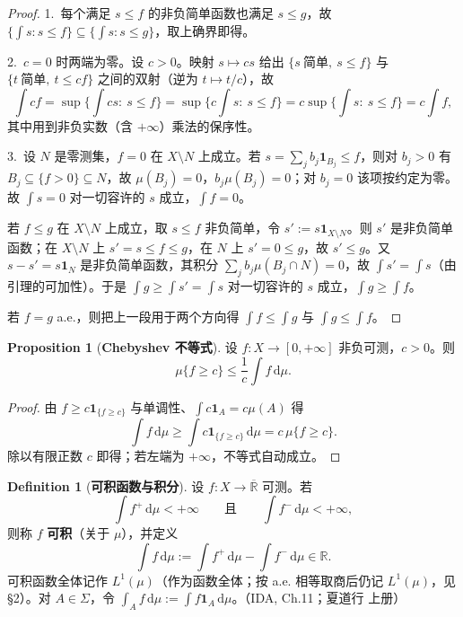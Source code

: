 \documentclass[oneside]{book}
\theoremstyle{definition}
\newcommand{\R}{\mathbb{R}}
\newcommand{\dd}{\mathrm{d}}
\theoremstyle{definition}
\newtheorem{proposition}{Proposition}[section]
\newtheorem{definition}{Definition}[section]
\begin{document}
	\begin{proof}
		1.\ 每个满足 $s\leqslant f$ 的非负简单函数也满足 $s\leqslant g$，故 $\{\int s:s\leqslant f\}\subseteq\{\int s:s\leqslant g\}$，取上确界即得。
		
		2.\ $c=0$ 时两端为零。设 $c>0$。映射 $s\mapsto cs$ 给出 $\{s\ \text{简单},\ s\leqslant f\}$ 与 $\{t\ \text{简单},\ t\leqslant cf\}$ 之间的双射（逆为 $t\mapsto t/c$），故
		\[
		\int cf=\sup\{\textstyle\int cs:\ s\leqslant f\}=\sup\{c\textstyle\int s:\ s\leqslant f\}=c\sup\{\textstyle\int s:\ s\leqslant f\}=c\int f,
		\]
		其中用到非负实数（含 $+\infty$）乘法的保序性。
		
		3.\ 设 $N$ 是零测集，$f=0$ 在 $X\setminus N$ 上成立。若 $s=\sum_j b_j\mathbf{1}_{B_j}\leqslant f$，则对 $b_j>0$ 有 $B_j\subseteq\{f>0\}\subseteq N$，故 $\mu(B_j)=0$，$b_j\mu(B_j)=0$；对 $b_j=0$ 该项按约定为零。故 $\int s=0$ 对一切容许的 $s$ 成立，$\int f=0$。
		
		若 $f\leqslant g$ 在 $X\setminus N$ 上成立，取 $s\leqslant f$ 非负简单，令 $s':=s\mathbf{1}_{X\setminus N}$。则 $s'$ 是非负简单函数；在 $X\setminus N$ 上 $s'=s\leqslant f\leqslant g$，在 $N$ 上 $s'=0\leqslant g$，故 $s'\leqslant g$。又 $s-s'=s\mathbf{1}_N$ 是非负简单函数，其积分 $\sum_j b_j\mu(B_j\cap N)=0$，故 $\int s'=\int s$（由引理的可加性）。于是 $\int g\geqslant\int s'=\int s$ 对一切容许的 $s$ 成立，$\int g\geqslant\int f$。
		
		若 $f=g$ a.e.，则把上一段用于两个方向得 $\int f\leqslant\int g$ 与 $\int g\leqslant\int f$。
	\end{proof}
	
	\begin{proposition}[\bfseries{Chebyshev 不等式}]
		设 $f:X\to[0,+\infty]$ 非负可测，$c>0$。则
		\[
		\mu\{f\geqslant c\}\leqslant\frac1c\int f\,\dd\mu .
		\]
	\end{proposition}
	
	\begin{proof}
		由 $f\geqslant c\mathbf{1}_{\{f\geqslant c\}}$ 与单调性、$\int c\mathbf{1}_{A}=c\mu(A)$ 得
		\[
		\int f\,\dd\mu\geqslant\int c\mathbf{1}_{\{f\geqslant c\}}\,\dd\mu=c\,\mu\{f\geqslant c\}.
		\]
		除以有限正数 $c$ 即得；若左端为 $+\infty$，不等式自动成立。
	\end{proof}
	
	\begin{definition}[\bfseries{可积函数与积分}]
		设 $f:X\to\overline{\R}$ 可测。若
		\[
		\int f^{+}\,\dd\mu<+\infty\qquad\text{且}\qquad\int f^{-}\,\dd\mu<+\infty ,
		\]
		则称 $f$ \textbf{可积}（关于 $\mu$），并定义
		\[
		\int f\,\dd\mu:=\int f^{+}\,\dd\mu-\int f^{-}\,\dd\mu\in\R .
		\]
		可积函数全体记作 $L^{1}(\mu)$（作为函数全体；按 a.e. 相等取商后仍记 $L^{1}(\mu)$，见 \S2）。对 $A\in\Sigma$，令 $\int_A f\,\dd\mu:=\int f\mathbf{1}_A\,\dd\mu$。（IDA, Ch.11；夏道行 上册）
	\end{definition}
	
\end{document}
